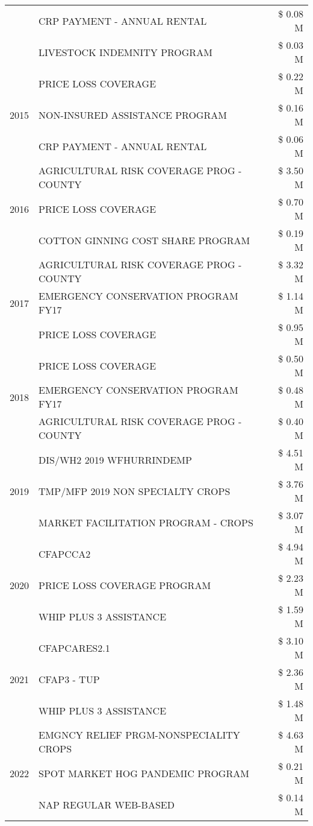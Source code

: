 \begin{tabular}{llr}
 & CRP PAYMENT - ANNUAL RENTAL & \$ 0.08 M \\
 & LIVESTOCK INDEMNITY PROGRAM & \$ 0.03 M \\
\cline{1-3}
\multirow[t]{3}{*}{2015} & PRICE LOSS COVERAGE & \$ 0.22 M \\
 & NON-INSURED ASSISTANCE PROGRAM & \$ 0.16 M \\
 & CRP PAYMENT - ANNUAL RENTAL & \$ 0.06 M \\
\cline{1-3}
\multirow[t]{3}{*}{2016} & AGRICULTURAL RISK COVERAGE PROG - COUNTY & \$ 3.50 M \\
 & PRICE LOSS COVERAGE & \$ 0.70 M \\
 & COTTON GINNING COST SHARE PROGRAM & \$ 0.19 M \\
\cline{1-3}
\multirow[t]{3}{*}{2017} & AGRICULTURAL RISK COVERAGE PROG - COUNTY & \$ 3.32 M \\
 & EMERGENCY CONSERVATION PROGRAM FY17 & \$ 1.14 M \\
 & PRICE LOSS COVERAGE & \$ 0.95 M \\
\cline{1-3}
\multirow[t]{3}{*}{2018} & PRICE LOSS COVERAGE & \$ 0.50 M \\
 & EMERGENCY CONSERVATION PROGRAM FY17 & \$ 0.48 M \\
 & AGRICULTURAL RISK COVERAGE PROG - COUNTY & \$ 0.40 M \\
\cline{1-3}
\multirow[t]{3}{*}{2019} & DIS/WH2 2019 WFHURRINDEMP & \$ 4.51 M \\
 & TMP/MFP 2019 NON SPECIALTY CROPS & \$ 3.76 M \\
 & MARKET FACILITATION PROGRAM - CROPS & \$ 3.07 M \\
\cline{1-3}
\multirow[t]{3}{*}{2020} & CFAPCCA2 & \$ 4.94 M \\
 & PRICE LOSS COVERAGE PROGRAM & \$ 2.23 M \\
 & WHIP PLUS 3 ASSISTANCE & \$ 1.59 M \\
\cline{1-3}
\multirow[t]{3}{*}{2021} & CFAPCARES2.1 & \$ 3.10 M \\
 & CFAP3 - TUP & \$ 2.36 M \\
 & WHIP PLUS 3 ASSISTANCE & \$ 1.48 M \\
\cline{1-3}
\multirow[t]{3}{*}{2022} & EMGNCY RELIEF PRGM-NONSPECIALITY CROPS & \$ 4.63 M \\
 & SPOT MARKET HOG PANDEMIC PROGRAM & \$ 0.21 M \\
 & NAP REGULAR WEB-BASED & \$ 0.14 M \\
\cline{1-3}
\bottomrule
\end{tabular}
